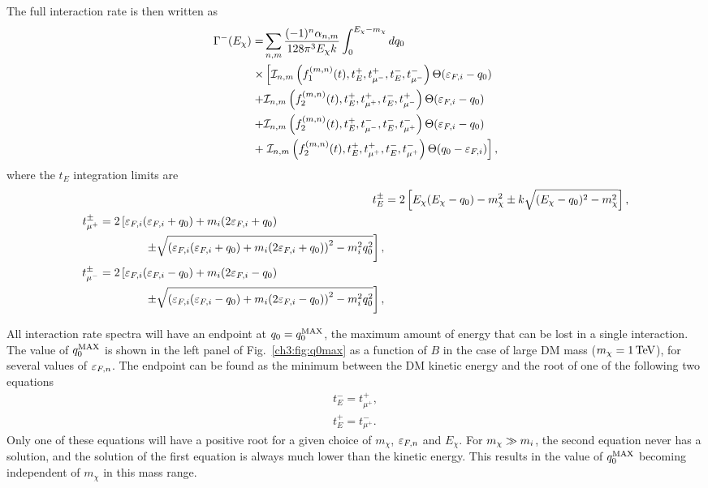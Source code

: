The full interaction rate is then written as
\begin{align}
    \begin{split}
        \Gamma^{-}(E_\chi)  =& \sum_{n,m}  \frac{(-1)^n \alpha_{n,m}}{128\pi^3 E_\chi k }\int_0^{E_\chi -m_\chi} dq_0  \\
         \times & \left[ \mathcal{I}_{n,m}\left(f_1^{(m,n)}(t),t_E^+,t_{\mu^-}^+,t_E^-,t_{\mu^-}^-\right)\Theta(\varepsilon_{F,i}-q_0)\right.\\
        + & \mathcal{I}_{n,m}\left(f_2^{(m,n)}(t),t_E^+,t_{\mu^+}^+,t_E^-,t_{\mu^-}^+\right)\Theta(\varepsilon_{F,i}-q_0) \\
        + & \mathcal{I}_{n,m}\left(f_2^{(m,n)}(t),t_E^+,t_{\mu^-}^-,t_E^-,t_{\mu^+}^-\right)\Theta(\varepsilon_{F,i}-q_0) \\
        + & \left. \mathcal{I}_{n,m}\left(f_2^{(m,n)}(t),t_E^+,t_{\mu^+}^+,t_E^-,t_{\mu^+}^-\right)\Theta(q_0-\varepsilon_{F,i}) \right], \label{app:eq:gammafull_app}
    \end{split}
\end{align}
where the $t_E$ integration limits are
\begin{align}
 t_E^\pm &= 2\left[E_\chi(E_\chi-q_0)-m_\chi^2\pm k\sqrt{(E_\chi-q_0)^2-m_\chi^2}\right],\\
 \begin{split}
    t_{\mu^{+}}^\pm &= 2\left[\varepsilon_{F,i}(\varepsilon_{F,i}+q_0)+m_i(2\varepsilon_{F,i}+q_0) \right. \\
    &\hspace{4em}\left.\pm \sqrt{\left(\varepsilon_{F,i}(\varepsilon_{F,i}+q_0)+m_i(2\varepsilon_{F,i}+q_0)\right)^2-m_i^2q_0^2}\right],
 \end{split}\\
 \begin{split}
    t_{\mu^{-}}^\pm &=  2\left[\varepsilon_{F,i}(\varepsilon_{F,i}-q_0)+m_i(2\varepsilon_{F,i}-q_0)\right.\\
    &\hspace{4em}\left.\pm\sqrt{\left(\varepsilon_{F,i}(\varepsilon_{F,i}-q_0)+m_i(2\varepsilon_{F,i}-q_0)\right)^2-m_i^2q_0^2}\right], 
 \end{split}
\end{align}

All interaction rate spectra will have an endpoint at $q_0 = q_0^{\rm MAX}$, the maximum amount of energy that can be lost in a single interaction.
The value of $q_0^{\rm MAX}$ is shown in the left panel of Fig.~\ref{ch3:fig:q0max} as a function of $B$ in the case of large DM mass ($m_\chi = 1{\rm \,TeV}$), for several values of $\varepsilon_{F,n}$. The endpoint can be found as the minimum between the DM kinetic energy and the root of one of the following two equations 
\begin{eqnarray}
    t_E^- = t_{\mu^+}^+,\\
    t_E^+ = t_{\mu^+}^-.
\end{eqnarray}
Only one of these equations will have a positive root for a given choice of $m_\chi$, $\varepsilon_{F,n}$ and $E_\chi$.
For $m_\chi\gg m_i$, the second equation never has a solution, and the solution of the first equation is always much lower than the kinetic energy. This results in the value of $q_0^{\rm MAX}$ becoming independent of $m_\chi$ in this mass range.


